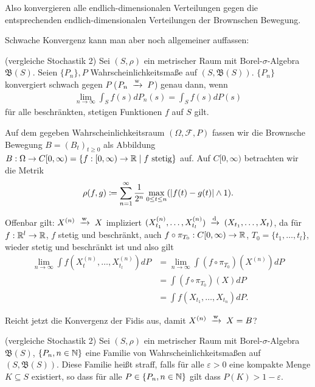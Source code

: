 \documentclass[a4paper,twoside,DIV15,BCOR12mm]{scrbook}
\newcommand{\cF}{\mathcal F}
\newcommand{\borel}{{\mathfrak B}}
\begin{document}
Also konvergieren alle endlich-dimensionalen Verteilungen gegen die entsprechenden endlich-dimensionalen Verteilungen der Brownschen Bewegung.

Schwache Konvergenz kann man aber noch allgemeiner auffassen:

\begin{definition}
(vergleiche Stochastik 2) Sei $(S,\rho)$ ein metrischer Raum mit Borel-$\sigma$-Algebra $\borel(S)$. Seien $\{P_n\}, P$ Wahrscheinlichkeitsmaße auf $(S,\borel(S))$. $\{P_n\}$ konvergiert schwach gegen $P$  ($P_n\tonach w P$) genau dann, wenn
\begin{align*}
\lim_{n\to\infty} \int_S f(s) dP_n(s) = \int_S f(s) dP(s)
\end{align*}
für alle beschränkten, stetigen Funktionen $f$ auf $S$ gilt.
\end{definition}

Auf dem gegeben Wahrscheinlichkeitsraum $(\Omega,\cF, P)$ fassen wir die Brownsche Bewegung $B=(B_t)_{t\ge 0}$ als Abbildung $B:\Omega \to C[0,\infty) = \{f: [0,\infty) \to \mathbb{R} \mid f \text{ stetig}\}$ auf. Auf $C[0,\infty)$ betrachten wir die Metrik
\begin{align*}
\rho(f,g) \da \sum_{n=1}^\infty \frac{1}{2^n} \max_{0\le t\le n}( | f(t)-g(t)| \wedge 1).
\end{align*}

Offenbar gilt: $X^{(n)} \tonach w X$ impliziert $(X_{t_1}^{(n)},\ldots,X_{t_l}^{(n)})\tonach d (X_{t_1},\ldots,X_{t})$, da für $f:\mathbb{R}^l\to \mathbb{R}$, $f$ stetig und beschränkt, auch $f\circ \pi_{T_0}: C[0,\infty) \to \mathbb{R}$, $T_0=\{t_1,\ldots,t_l\}$, wieder stetig und beschränkt ist und also gilt
\begin{align*}
\lim_{n\to\infty} \int f(X_t^{(n)},\ldots,X_{t_l}^{(n)}) dP 
&=\lim_{n\to\infty} \int (f\circ \pi_{T_0}) (X^{(n)}) dP\\
&= \int(f\circ \pi_{T_0})(X)dP \\
&= \int f(X_{t_1},\ldots,X_{t_n})dP.
\end{align*}

Reicht jetzt die Konvergenz der Fidis aus, damit $X^{(n)} \tonach w X=B$?

\begin{definition}
(vergleiche Stochastik 2) Sei $(S,\rho)$ ein metrischer Raum mit Borel-$\sigma$-Algebra $\borel(S)$, $\{P_n, n\in\mathbb{N}\}$ eine Familie von Wahrscheinlichkeitsmaßen auf $(S,\borel(S))$. Diese Familie heißt straff, falls für alle $\varepsilon >0$ eine kompakte Menge $K\subseteq S$ existiert, so dass für alle $P\in \{P_n,n\in\mathbb{N}\}$ gilt dass $P(K) > 1-\varepsilon$.
\end{definition}
\end{document}
